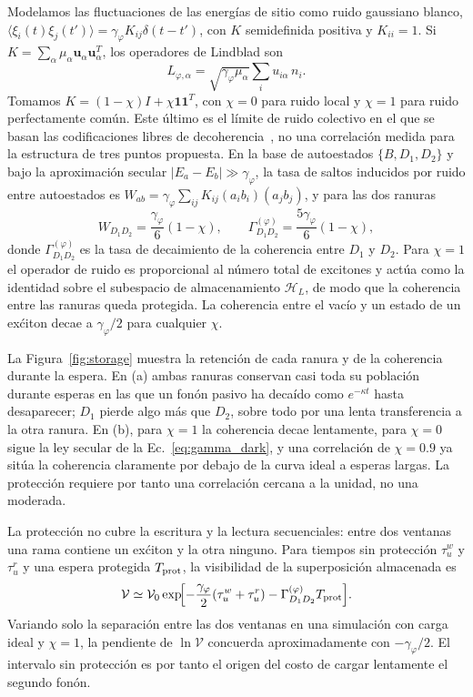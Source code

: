 \documentclass[aps,pra,twocolumn,groupedaddress,amsmath,amssymb,floatfix]{revtex4-2}
\begin{document}
Modelamos las fluctuaciones de las energ\'ias de sitio como ruido gaussiano blanco, $\langle\xi_i(t)\xi_j(t')\rangle=\gamma_\varphi K_{ij}\delta(t-t')$, con $K$ semidefinida positiva y $K_{ii}=1$. Si $K=\sum_\alpha\mu_\alpha\bm u_\alpha\bm u_\alpha^T$, los operadores de Lindblad son
\begin{equation}
L_{\varphi,\alpha}=\sqrt{\gamma_\varphi\mu_\alpha}\sum_iu_{i\alpha}\,n_i.\label{eq:noisejumps}
\end{equation}
Tomamos $K=(1-\chi)I+\chi\bm1\bm1^T$, con $\chi=0$ para ruido local y $\chi=1$ para ruido perfectamente com\'un. Este \'ultimo es el l\'imite de ruido colectivo en el que se basan las codificaciones libres de decoherencia~\cite{lidar1998,friesen2017}, no una correlaci\'on medida para la estructura de tres puntos propuesta. En la base de autoestados $\{B,D_1,D_2\}$ y bajo la aproximaci\'on secular $|E_a-E_b|\gg\gamma_\varphi$, la tasa de saltos inducidos por ruido entre autoestados es $W_{ab}=\gamma_\varphi\sum_{ij}K_{ij}(a_ib_i)(a_jb_j)$, y para las dos ranuras
\begin{equation}
W_{D_1D_2}=\frac{\gamma_\varphi}{6}(1-\chi),\qquad
\Gamma_{D_1D_2}^{(\varphi)}=\frac{5\gamma_\varphi}{6}(1-\chi),\label{eq:gamma_dark}
\end{equation}
donde $\Gamma_{D_1D_2}^{(\varphi)}$ es la tasa de decaimiento de la coherencia entre $D_1$ y $D_2$. Para $\chi=1$ el operador de ruido es proporcional al n\'umero total de excitones y act\'ua como la identidad sobre el subespacio de almacenamiento $\mathcal H_L$, de modo que la coherencia entre las ranuras queda protegida. La coherencia entre el vac\'io y un estado de un ex\'citon decae a $\gamma_\varphi/2$ para cualquier $\chi$.

La Figura~\ref{fig:storage} muestra la retenci\'on de cada ranura y de la coherencia durante la espera. En (a) ambas ranuras conservan casi toda su poblaci\'on durante esperas en las que un fon\'on pasivo ha deca\'ido como $e^{-\kappa t}$ hasta desaparecer; $D_1$ pierde algo m\'as que $D_2$, sobre todo por una lenta transferencia a la otra ranura. En (b), para $\chi=1$ la coherencia decae lentamente, para $\chi=0$ sigue la ley secular de la Ec.~\eqref{eq:gamma_dark}, y una correlaci\'on de $\chi=0.9$ ya sit\'ua la coherencia claramente por debajo de la curva ideal a esperas largas. La protecci\'on requiere por tanto una correlaci\'on cercana a la unidad, no una moderada.

La protecci\'on no cubre la escritura y la lectura secuenciales: entre dos ventanas una rama contiene un ex\'citon y la otra ninguno. Para tiempos sin protecci\'on $\tau_u^w$ y $\tau_u^r$ y una espera protegida $T_{\rm prot}$, la visibilidad de la superposici\'on almacenada es
\begin{equation}
\mathcal V\simeq\mathcal V_0\exp\!\Bigl[-\frac{\gamma_\varphi}{2}(\tau_u^w+\tau_u^r)-\Gamma_{D_1D_2}^{(\varphi)}T_{\rm prot}\Bigr].\label{eq:visibility}
\end{equation}
Variando solo la separaci\'on entre las dos ventanas en una simulaci\'on con carga ideal y $\chi=1$, la pendiente de $\ln\mathcal V$ concuerda aproximadamente con $-\gamma_\varphi/2$. El intervalo sin protecci\'on es por tanto el origen del costo de cargar lentamente el segundo fon\'on.
\end{document}
